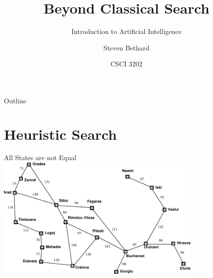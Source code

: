\documentclass[12pt]{beamer}
\title{Beyond Classical Search}
\subtitle{Introduction to Artificial Intelligence}
\author{Steven Bethard}
\institute{
  Department of Computer Science\\
  University of Colorado
}
\date{CSCI 3202}
\begin{document}
\begin{frame}
  \titlepage
\end{frame}

\begin{frame}{Outline}
	\footnotesize
  \tableofcontents
\end{frame}


\section{Heuristic Search}
\begin{frame}{All States are not Equal}
	\includegraphics[width=4in]{romania-distances.pdf}
\end{frame}
\end{document}
